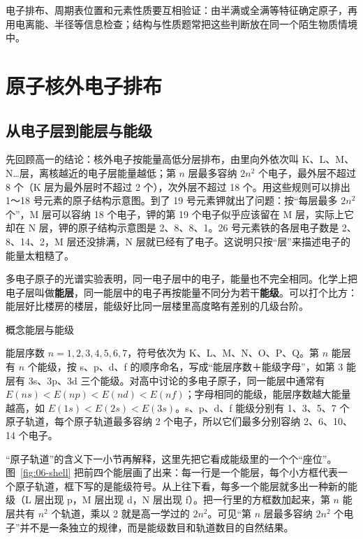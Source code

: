 \documentclass[UTF8,a4paper,zihao=5,oneside,openany,fontset=none]{ctexbook}
\def\heiti{\CJKfamily{zhhei}}
\newcommand{\textheading}[2]{\par\addvspace{.6em}\Needspace{4\baselineskip}\noindent
 {\heiti\if\relax\detokenize{#2}\relax #1\else #2\fi}\par\nobreak\smallskip\nobreak\color{black}\ignorespaces}
\newenvironment{gainian}[1][]{\textheading{概念}{#1}}{\par\smallskip}
\begin{document}
电子排布、周期表位置和元素性质要互相验证：由半满或全满等特征确定原子，再用电离能、半径等信息检查；结构与性质题常把这些判断放在同一个陌生物质情境中。

\section{原子核外电子排布}

\subsection{从电子层到能层与能级}
先回顾高一的结论：核外电子按能量高低分层排布，由里向外依次叫 K、L、M、N…层，离核越近的电子层能量越低；第 $n$ 层最多容纳 $2n^2$ 个电子，最外层不超过 8 个（K 层为最外层时不超过 2 个），次外层不超过 18 个。用这些规则可以排出 1～18 号元素的原子结构示意图。到了 19 号元素钾就出了问题：按“每层最多 $2n^2$ 个”，M 层可以容纳 18 个电子，钾的第 19 个电子似乎应该留在 M 层，实际上它却在 N 层，钾的原子结构示意图是 2、8、8、1。26 号元素铁的各层电子数是 2、8、14、2，M 层还没排满，N 层就已经有了电子。这说明只按“层”来描述电子的能量太粗糙了。

多电子原子的光谱实验表明，同一电子层中的电子，能量也不完全相同。化学上把电子层叫做\textbf{能层}，同一能层中的电子再按能量不同分为若干\textbf{能级}。可以打个比方：能层好比楼房的楼层，能级好比同一层楼里高度略有差别的几级台阶。

\begin{gainian}[能层与能级]
能层序数 $n=1,2,3,4,5,6,7$，符号依次为 K、L、M、N、O、P、Q。第 $n$ 能层有 $n$ 个能级，按 s、p、d、f 的顺序命名，写成“能层序数＋能级字母”，如第 3 能层有 3s、3p、3d 三个能级。对高中讨论的多电子原子，同一能层中通常有 $E(ns)<E(np)<E(nd)<E(nf)$；字母相同的能级，能层序数越大能量越高，如 $E(1s)<E(2s)<E(3s)$。s、p、d、f 能级分别有 1、3、5、7 个原子轨道，每个原子轨道最多容纳 2 个电子，所以它们最多分别容纳 2、6、10、14 个电子。
\end{gainian}

“原子轨道”的含义下一小节再解释，这里先把它看成能级里的一个个“座位”。图~\ref{fig:06-shell} 把前四个能层画了出来：每一行是一个能层，每个小方框代表一个原子轨道，框下写的是能级符号。从上往下看，每多一个能层就多出一种新的能级（L 层出现 p，M 层出现 d，N 层出现 f）。把一行里的方框数加起来，第 $n$ 能层共有 $n^2$ 个轨道，乘以 2 就是高一学过的 $2n^2$。可见“第 $n$ 层最多容纳 $2n^2$ 个电子”并不是一条独立的规律，而是能级数目和轨道数目的自然结果。
\end{document}
